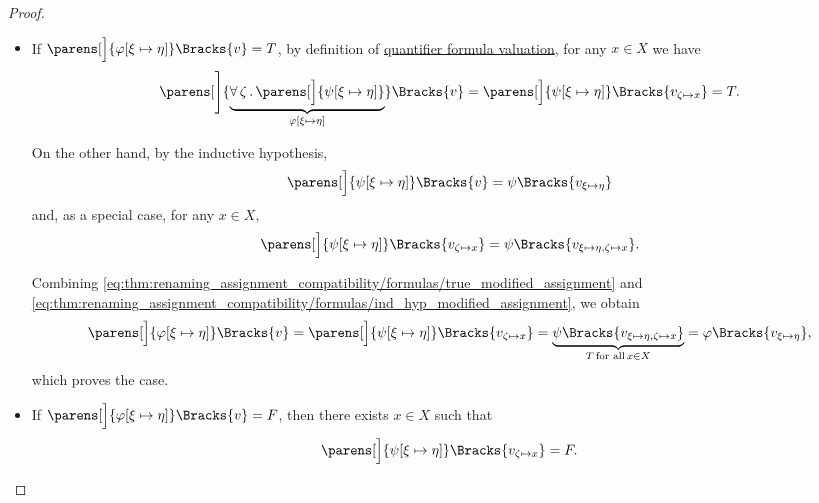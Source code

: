 \begin{proof}
\begin{itemize}
\begin{itemize}
      \begin{itemize}
        \item If \( \parens[\Big]{\varphi[\xi \mapsto \eta]}\Bracks{v} = T \), by definition of \hyperref[def:first_order_valuation/formula_valuation]{quantifier formula valuation}, for any \( x \in X \) we have
        \begin{equation}\label{eq:thm:renaming_assignment_compatibility/formulas/true_modified_assignment}
          \parens[\Bigg]{\underbrace{\qforall \zeta \parens[\Big]{ \psi[\xi \mapsto \eta] }}_{\varphi[\xi \mapsto \eta]} }\Bracks{v}
          =
          \parens[\Big]{\psi[\xi \mapsto \eta]}\Bracks{v_{\zeta \mapsto x}}
          =
          T.
        \end{equation}

        On the other hand, by the inductive hypothesis,
        \begin{equation*}
          \parens[\Big]{ \psi[\xi \mapsto \eta] }\Bracks{v} = \psi\Bracks{v_{\xi \mapsto \eta}}
        \end{equation*}
        and, as a special case, for any \( x \in X \),
        \begin{equation}\label{eq:thm:renaming_assignment_compatibility/formulas/ind_hyp_modified_assignment}
          \parens[\Big]{ \psi[\xi \mapsto \eta] }\Bracks{v_{\zeta \mapsto x}} = \psi\Bracks{v_{\xi \mapsto \eta, \zeta \mapsto x}}.
        \end{equation}

        Combining \eqref{eq:thm:renaming_assignment_compatibility/formulas/true_modified_assignment} and \eqref{eq:thm:renaming_assignment_compatibility/formulas/ind_hyp_modified_assignment}, we obtain
        \begin{equation*}
          \parens[\Big]{ \varphi[\xi \mapsto \eta] }\Bracks{v}
          =
          \parens[\Big]{ \psi[\xi \mapsto \eta] }\Bracks{v_{\zeta \mapsto x}}
          =
          \underbrace{\psi\Bracks{v_{\xi \mapsto \eta, \zeta \mapsto x}}}_{T \T{for all} x \in X}
          =
          \varphi\Bracks{v_{\xi \mapsto \eta}},
        \end{equation*}
        which proves the case.

        \item If \( \parens[\Big]{\varphi[\xi \mapsto \eta]}\Bracks{v} = F \), then there exists \( x \in X \) such that
        \begin{equation*}
          \parens[\Big]{\psi[\xi \mapsto \eta]}\Bracks{v_{\zeta \mapsto x}} = F.
        \end{equation*}


\end{itemize}
\end{itemize}
\end{itemize}
\end{proof}
